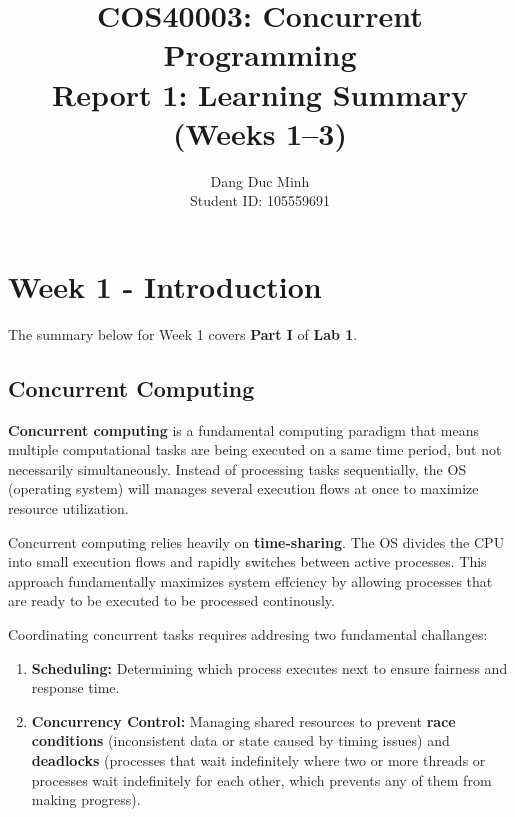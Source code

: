 \documentclass[11pt,a4paper]{article}
\title{\textbf{COS40003: Concurrent Programming} \\ \Large Report 1: Learning Summary (Weeks 1--3)}
\author{Dang Duc Minh \\[0.3em]     Student ID: 105559691}
\date{}
\begin{document}
\maketitle  
\tableofcontents
\newpage

\section{Week 1 - Introduction}

The summary below for Week 1 covers \textbf{Part I} of \textbf{Lab 1}.

\subsection{Concurrent Computing}
\textbf{Concurrent computing} is a fundamental computing paradigm that means multiple computational 
tasks are being executed on a same time period, but not necessarily 
simultaneously. Instead of processing tasks sequentially, the OS (operating system) will manages 
several execution flows at once to maximize resource utilization.

\hspace{5pt}

\noindent Concurrent computing relies heavily on \textbf{time-sharing}. The OS divides 
the CPU into small execution flows and rapidly switches between active processes. This approach
fundamentally maximizes system effciency by allowing processes that are ready to be executed to be
processed continously.

\hspace{5pt}

\noindent Coordinating concurrent tasks requires addresing two fundamental challanges:
 

\begin{enumerate}
    \item \textbf{Scheduling:} Determining which process executes next to ensure fairness and response time.
    \item \textbf{Concurrency Control:} Managing shared resources to prevent \textbf{race conditions} (inconsistent data or state caused by timing issues) and \textbf{deadlocks} (processes that wait indefinitely where two or more threads or processes wait indefinitely for each other, which prevents any of them from making progress).
\end{enumerate}
\end{document}
